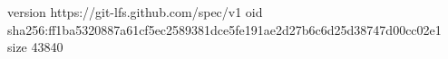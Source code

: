 version https://git-lfs.github.com/spec/v1
oid sha256:ff1ba5320887a61cf5ec2589381dce5fe191ae2d27b6c6d25d38747d00cc02e1
size 43840
